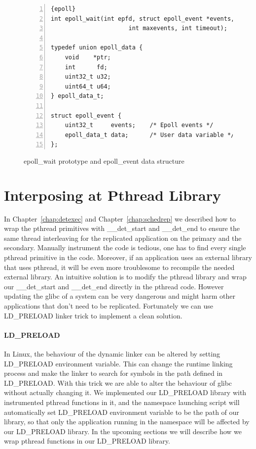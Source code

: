 \begin{figure}
\begin{lstlisting}[numbers=left, frame=single, basicstyle=\small, breaklines]{epoll}
int epoll_wait(int epfd, struct epoll_event *events,
                      int maxevents, int timeout);

typedef union epoll_data {
    void    *ptr;
    int      fd;
    uint32_t u32;
    uint64_t u64;
} epoll_data_t;

struct epoll_event {
    uint32_t     events;    /* Epoll events */
    epoll_data_t data;      /* User data variable */
};

\end{lstlisting}
\caption{epoll\_wait prototype and epoll\_event data structure}
\label{f:epoll}
\end{figure}

\section{Interposing at Pthread Library} \label{sec:library}
In Chapter~\ref{chap:detexec} and Chapter~\ref{chap:schedrep} we described how to wrap the pthread primitives with \_\_det\_start and \_\_det\_end to ensure the same thread interleaving for the replicated application on the primary and the secondary. Manually instrument the code is tedious, one has to find every single pthread primitive in the code. Moreover, if an application uses an external library that uses pthread, it will be even more troublesome to recompile the needed external library. An intuitive solution is to modify the pthread library and wrap our \_\_det\_start and \_\_det\_end directly in the pthread code. However updating the glibc of a system can be very dangerous and might harm other applications that don't need to be replicated. Fortunately we can use LD\_PRELOAD linker trick to implement a clean solution.

\paragraph{LD\_PRELOAD}
In Linux, the behaviour of the dynamic linker can be altered by setting LD\_PRELOAD environment variable. This can change the runtime linking process and make the linker to search for symbols in the path defined in LD\_PRELOAD. With this trick we are able to alter the behaviour of glibc without actually changing it. We implemented our LD\_PRELOAD library with instrumented pthread functions in it, and the namespace launching script will automatically set LD\_PRELOAD environment variable to be the path of our library, so that only the application running in the namespace will be affected by our LD\_PRELOAD library. In the upcoming sections we will describe how we wrap pthread functions in our LD\_PRELOAD library.

